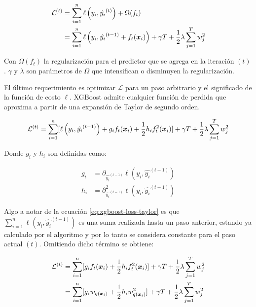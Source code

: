 \begin{align}
    \mathcal{L}^{(t)} &= \sum_{i=1}^{n} \ell\left( y_i, \hat{y_i}^{(t)} \right) + \Omega(f_t) \\
                      &= \sum_{i=1}^{n} \ell\left( y_i, \hat{y_i}^{(t - 1)} + f_t{(\boldsymbol{x}_i)} \right) + \gamma T + \frac{1}{2} \lambda \sum_{j=1}^{T} w_{j}^{2}
\end{align}

Con $\Omega(f_t)$ la regularización para el predictor que se agrega en la
iteración $(t)$. $\gamma$ y $\lambda$ son parámetros de $\Omega$ que intensifican o
disminuyen la regularización.

El último requerimiento es optimizar $\mathcal{L}$ para un paso arbitrario y el
significado de la función de costo $\ell$. XGBoost admite cualquier función de
perdida que aproxima a partir de una expansión de Taylor de segundo orden.

\begin{equation} \label{eq:xgboost-loss-taylor}
    \mathcal{L}^{(t)} = \sum_{i = 1}^{n} [
        \ell\left(y_i,
                  \hat{y_{i}}^{(t-1)}
            \right) +
                g_i f_t(\boldsymbol{x}_i) +
                \frac{1}{2} h_i f_t^{2}(\boldsymbol{x}_i)
        ] + \gamma T + \frac{1}{2} \lambda \sum_{j=1}^{T} w_{j}^{2}
\end{equation}

Donde $g_i$ y $h_i$ son definidas como:

\begin{align}
    g_i &= \partial_{\hat{y_{i}}^{(t-1)}} \ell\left(y_i, \hat{y_{i}}^{(t-1)}\right) \\
    h_i &= \partial_{\hat{y_{i}}^{(t-1)}}^{2} \ell\left(y_i, \hat{y_{i}}^{(t-1)}\right)
\end{align}

Algo a notar de la ecuación \ref{eq:xgboost-loss-taylor} es que $\sum_{i =
1}^{n} \ell\left(y_i, \hat{y_{i}}^{(t-1)} \right)$ es una suma realizada hasta
un paso anterior, estando ya calculado por el algoritmo y por lo tanto se
considera constante para el paso actual $(t)$. Omitiendo dicho término se
obtiene:

\begin{align}
    \mathcal{L}^{(t)} &= \sum_{i = 1}^{n} [
        g_i f_t(\boldsymbol{x}_i) +
                \frac{1}{2} h_i f_t^{2}(\boldsymbol{x}_i)
        ] + \gamma T + \frac{1}{2} \lambda \sum_{j=1}^{T} w_{j}^{2} \\
                      &= \sum_{i = 1}^{n} [ \label{eq:xgboost-loss-final}
                        g_i w_{q(\boldsymbol{x}_i)} +
                                \frac{1}{2} h_i w_{q(\boldsymbol{x}_i)}^{2}
                        ] + \gamma T + \frac{1}{2} \lambda \sum_{j=1}^{T} w_{j}^{2}
\end{align}

